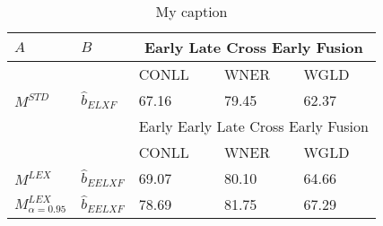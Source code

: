 \begin{table}[]
\centering
\label{my-label}
\begin{tabular}{@{}lllll@{}}
	\toprule
	$A$                      & $B$                                   &    \multicolumn{3}{c}{Early Late Cross Early Fusion}    \\ \midrule
	                         &                                       & CONLL & WNER  & WGLD                                    \\
	\cmidrule{3-5}
$M^{STD}$ & $ \hat{b}_{\scriptscriptstyle ELXF}$  & 67.16 & 79.45 & 62.37                                   \\ \midrule
	                         &                                       & \multicolumn{3}{c}{Early Early Late Cross Early Fusion} \\ \midrule
	                         &                                       & CONLL & WNER  & WGLD                                    \\
	\cmidrule{3-5}
$M^{LEX}$ & $ \hat{b}_{\scriptscriptstyle EELXF}$ & 69.07 & 80.10 & 64.66                                   \\
	$M^{LEX}_{\alpha=0.95}$  & $ \hat{b}_{\scriptscriptstyle EELXF}$ & 78.69 & 81.75 & 67.29                                   \\ \bottomrule
\end{tabular}
\caption{My caption}
\end{table}

